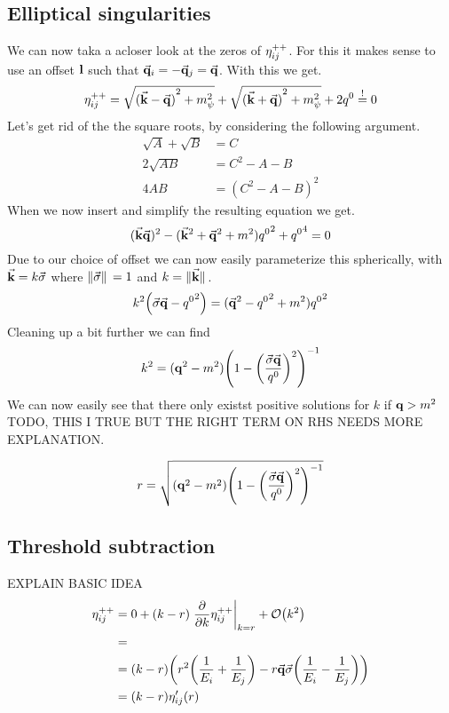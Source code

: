 \subsection{Elliptical singularities}
We can now taka a acloser look at the zeros of $\eta_{ij}^{++}$.
For this it makes sense to use an offset $\vb{l}$ such that $\va{q}_i = -\va{q}_j = \va{q}$.
With this we get.
\begin{equation}
    \eta_{ij}^{++} =  \sqrt{{(\va{k}-\va{q})}^2+m_\psi^2} + \sqrt{{(\va{k}+\va{q})}^2+m_\psi^2} + 2q^0 \overset{!}{=} 0
\end{equation}
Let's get rid of the the square roots, by considering the following argument.
\begin{align}
    \sqrt{A}+\sqrt{B} &= C\\
    2\sqrt{AB} &= C^2-A-B\\
    4AB &= (C^2-A-B)^2
\end{align}
When we now insert and simplify the resulting equation we get.
\begin{equation}
    (\va{k}\va{q})^2-(\va{k}^2+\va{q}^2+m^2){q^0}^2+{q^0}^4 = 0
\end{equation}
Due to our choice of offset we can now easily parameterize this spherically, with $\va{k} = k\va{\sigma}$ where $\norm*{\va{\sigma}} = 1$ and $k = \norm*{\va{k}}$.
\begin{align}
    k^2 \qty(\va{\sigma}\va{q}-{q^0}^2) = (\va{q}^2-{q^0}^2+m^2){q^0}^2
\end{align}
Cleaning up a bit further we can find
\begin{align}
    k^2 = (\vb{q}^2-m^2){\qty(1-{\qty(\frac{\va{\sigma}\va{q}}{q^0})^2})}^{-1}
\end{align}
We can now easily see that there only existst positive solutions for $k$ if $\vb{q}>m^2$
TODO, THIS I TRUE BUT THE RIGHT TERM ON RHS NEEDS MORE EXPLANATION.

\begin{equation}
    r = \sqrt{(\vb{q}^2-m^2){\qty(1-{\qty(\frac{\va{\sigma}\va{q}}{q^0})^2})}^{-1}}
\end{equation}

\subsection{Threshold subtraction}
EXPLAIN BASIC IDEA
\begin{align}
    \ELIPT{i}{j} & = 0 + (k-r) \eval{\pdv{k} \ELIPT{i}{j}}_{k=r} + \order{k^2} \\
    &= \\
    &= (k-r) \qty(r^2 \qty(\frac{1}{E_i}+\frac{1}{E_j})  - r \va{q}\va{\sigma}\qty(\frac{1}{E_i}-\frac{1}{E_j}))\\
    &= (k-r) \eta_{ij}'(r)
\end{align}

